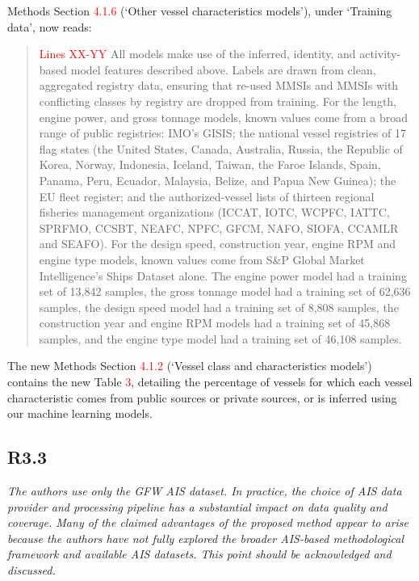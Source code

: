 \documentclass[11pt]{article}
\newcommand{\point}[1]{\subsection*{\normalfont\bfseries #1}}
\begin{document}
Methods Section \textcolor{red}{4.1.6} (`Other vessel characteristics models'), under `Training data', now reads:

\begin{quote}
\textcolor{red}{Lines XX-YY}
All models make use of the inferred, identity, and activity-based model features described above. Labels are drawn from clean, aggregated registry data, ensuring that re-used MMSIs and MMSIs with conflicting classes by registry are dropped from training. For the length, engine power, and gross tonnage models, known values come from a broad range of public registries: IMO's GISIS; the national vessel registries of 17 flag states (the United States, Canada, Australia, Russia, the Republic of Korea, Norway, Indonesia, Iceland, Taiwan, the Faroe Islands, Spain, Panama, Peru, Ecuador, Malaysia, Belize, and Papua New Guinea); the EU fleet register; and the authorized-vessel lists of thirteen regional fisheries management organizations (ICCAT, IOTC, WCPFC, IATTC, SPRFMO, CCSBT, NEAFC, NPFC, GFCM, NAFO, SIOFA, CCAMLR and SEAFO). For the design speed, construction year, engine RPM and engine type models, known values come from S\&P Global Market Intelligence's Ships Dataset alone. The engine power model had a training set of 13,842 samples, the gross tonnage model had a training set of 62,636 samples, the design speed model had a training set of 8,808 samples, the construction year and engine RPM models had a training set of 45,868 samples, and the engine type model had a training set of 46,108 samples.
\end{quote}

The new Methods Section \textcolor{red}{4.1.2} (`Vessel class and characteristics models') contains the new Table \textcolor{red}{3}, detailing the percentage of vessels for which each vessel characteristic comes from public sources or private sources, or is inferred using our machine learning models. 

\point{R3.3}

\begin{refquote}\itshape
The authors use only the GFW AIS dataset. In practice, the choice of AIS data
provider and processing pipeline has a substantial impact on data quality and
coverage. Many of the claimed advantages of the proposed method appear to arise
because the authors have not fully explored the broader AIS-based methodological
framework and available AIS datasets. This point should be acknowledged and
discussed.
\end{refquote}
\end{document}
